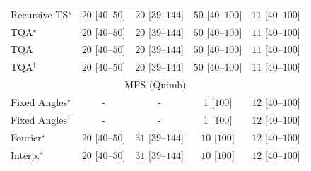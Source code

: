 \begin{tabular}{l|cccc|}
Recursive TS$^\star$ & {\cellcolor[HTML]{E8F6E4}} \color[HTML]{000000} $20$ [$40$--$50$] & {\cellcolor[HTML]{E8F6E4}} \color[HTML]{000000} $20$ [$39$--$144$] & {\cellcolor[HTML]{C2E7BB}} \color[HTML]{000000} $50$ [$40$--$100$] & {\cellcolor[HTML]{F0F9EC}} \color[HTML]{000000} $11$ [$40$--$100$] \\
TQA$^\star$ & {\cellcolor[HTML]{E8F6E4}} \color[HTML]{000000} $20$ [$40$--$50$] & {\cellcolor[HTML]{E8F6E4}} \color[HTML]{000000} $20$ [$39$--$144$] & {\cellcolor[HTML]{C2E7BB}} \color[HTML]{000000} $50$ [$40$--$100$] & {\cellcolor[HTML]{F0F9EC}} \color[HTML]{000000} $11$ [$40$--$100$] \\
TQA & {\cellcolor[HTML]{E8F6E4}} \color[HTML]{000000} $20$ [$40$--$50$] & {\cellcolor[HTML]{E8F6E4}} \color[HTML]{000000} $20$ [$39$--$144$] & {\cellcolor[HTML]{C2E7BB}} \color[HTML]{000000} $50$ [$40$--$100$] & {\cellcolor[HTML]{F0F9EC}} \color[HTML]{000000} $11$ [$40$--$100$] \\
TQA$^\dagger$ & {\cellcolor[HTML]{E8F6E4}} \color[HTML]{000000} $20$ [$40$--$50$] & {\cellcolor[HTML]{E8F6E4}} \color[HTML]{000000} $20$ [$39$--$144$] & {\cellcolor[HTML]{C2E7BB}} \color[HTML]{000000} $50$ [$40$--$100$] & {\cellcolor[HTML]{F0F9EC}} \color[HTML]{000000} $11$ [$40$--$100$] \\
\cline{1-5}
\multicolumn{5}{c}{\rule{0pt}{8pt}MPS (Quimb)} \\
\midrule
Fixed Angles$^\star$ & {\cellcolor[HTML]{000000}} \color[HTML]{F1F1F1} {\cellcolor{white}} \color{black} - & {\cellcolor[HTML]{000000}} \color[HTML]{F1F1F1} {\cellcolor{white}} \color{black} - & {\cellcolor[HTML]{F7FCF5}} \color[HTML]{000000} $1$ [$100$] & {\cellcolor[HTML]{EFF9EB}} \color[HTML]{000000} $12$ [$40$--$100$] \\
Fixed Angles$^\dagger$ & {\cellcolor[HTML]{000000}} \color[HTML]{F1F1F1} {\cellcolor{white}} \color{black} - & {\cellcolor[HTML]{000000}} \color[HTML]{F1F1F1} {\cellcolor{white}} \color{black} - & {\cellcolor[HTML]{F7FCF5}} \color[HTML]{000000} $1$ [$100$] & {\cellcolor[HTML]{EFF9EB}} \color[HTML]{000000} $12$ [$40$--$100$] \\
Fourier$^\star$ & {\cellcolor[HTML]{E8F6E4}} \color[HTML]{000000} $20$ [$40$--$50$] & {\cellcolor[HTML]{DCF2D7}} \color[HTML]{000000} $31$ [$39$--$144$] & {\cellcolor[HTML]{F0F9ED}} \color[HTML]{000000} $10$ [$100$] & {\cellcolor[HTML]{EFF9EB}} \color[HTML]{000000} $12$ [$40$--$100$] \\
Interp.$^\star$ & {\cellcolor[HTML]{E8F6E4}} \color[HTML]{000000} $20$ [$40$--$50$] & {\cellcolor[HTML]{DCF2D7}} \color[HTML]{000000} $31$ [$39$--$144$] & {\cellcolor[HTML]{F0F9ED}} \color[HTML]{000000} $10$ [$100$] & {\cellcolor[HTML]{EFF9EB}} \color[HTML]{000000} $12$ [$40$--$100$] \\

\end{tabular}
